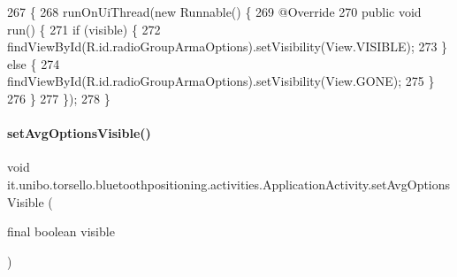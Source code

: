 \begin{DoxyCode}
267                                                               \{
268         runOnUiThread(\textcolor{keyword}{new} Runnable() \{
269             @Override
270             \textcolor{keyword}{public} \textcolor{keywordtype}{void} run() \{
271                 \textcolor{keywordflow}{if} (visible) \{
272                     findViewById(R.id.radioGroupArmaOptions).setVisibility(View.VISIBLE);
273                 \} \textcolor{keywordflow}{else} \{
274                     findViewById(R.id.radioGroupArmaOptions).setVisibility(View.GONE);
275                 \}
276             \}
277         \});
278     \}
\end{DoxyCode}
\hypertarget{classit_1_1unibo_1_1torsello_1_1bluetoothpositioning_1_1activities_1_1ApplicationActivity_ab50a70cb5d2d98211598b297a10bc44f_ab50a70cb5d2d98211598b297a10bc44f}{}\label{classit_1_1unibo_1_1torsello_1_1bluetoothpositioning_1_1activities_1_1ApplicationActivity_ab50a70cb5d2d98211598b297a10bc44f_ab50a70cb5d2d98211598b297a10bc44f} 
\paragraph{\texorpdfstring{set\+Avg\+Options\+Visible()}{setAvgOptionsVisible()}}
{\footnotesize\ttfamily void it.\+unibo.\+torsello.\+bluetoothpositioning.\+activities.\+Application\+Activity.\+set\+Avg\+Options\+Visible (\begin{DoxyParamCaption}\item[{final boolean}]{visible }\end{DoxyParamCaption})\hspace{0.3cm}{\ttfamily [private]}}


